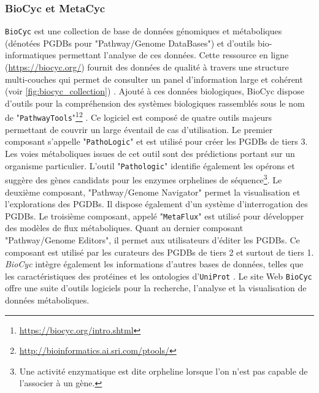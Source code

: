 \begin{refsegment}
    \subsubsection{BioCyc et MetaCyc}
    
    \texttt{BioCyc} \cite{caspi2006metacyc,caspi2007metacyc,caspi2008metacyc,caspi2010metacyc,caspi2012metacyc,caspi2013metacyc,caspi2014metacyc,caspi2015metacyc,caspi2016metacyc} est une collection de base de données génomiques et métaboliques (dénotées PGDBs pour "Pathway/Genome DataBases") et d'outils bio-informatiques permettant l'analyse de ces données. Cette ressource en ligne (\url{https://biocyc.org/}) fournit des données de qualité à travers une structure multi-couches qui permet de consulter un panel d'information large et cohérent (voir \cref{fig:biocyc_collection}) . Ajouté à ces données biologiques, BioCyc dispose d'outils pour la compréhension des systèmes biologiques rassemblés sous le nom de  "\texttt{PathwayTools}"\footnote{\url{https://biocyc.org/intro.shtml}}\footnote{\url{http://bioinformatics.ai.sri.com/ptools/}} \cite{karpe2011pathway,karp2015pathway}. Ce logiciel est composé de quatre outils majeurs permettant de couvrir un large éventail de cas d'utilisation. Le premier composant s'appelle "\texttt{PathoLogic}" et est utilisé pour créer les PGDBs de tiers 3. Les voies métaboliques issues de cet outil sont des prédictions portant sur un organisme particulier. L'outil "\texttt{Pathologic}" identifie également les opérons \cite{romero2004using} et suggère des gènes candidats pour les enzymes orphelines de séquence\footnote{Une activité enzymatique est dite orpheline lorsque l'on n'est pas capable de l'associer à un gène.}\cite{Green2004}. Le deuxième composant, "Pathway/Genome Navigator" permet la visualisation et l'explorations des PGDBs. Il dispose également d'un système d'interrogation des PGDBs. Le troisième composant, appelé "\texttt{MetaFlux}" est utilisé pour développer des modèles de flux métaboliques. Quant au dernier composant "Pathway/Genome Editors", il permet aux utilisateurs d'éditer les PGDBs. Ce composant est utilisé par les curateurs des PGDBs de tiers 2 et surtout de tiers 1. \textit{BioCyc} intègre également les informations d'autres bases de données, telles que les caractéristiques des protéines et les ontologies d'\texttt{UniProt} . Le site Web \texttt{BioCyc} offre une suite d'outils logiciels pour la recherche, l'analyse et la visualisation de données métaboliques.
    

\end{refsegment}
